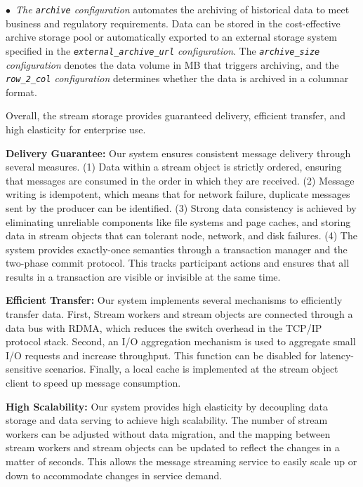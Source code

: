 $\bullet$~\textit{The \texttt{archive} configuration} automates the archiving of historical data to meet business and regulatory requirements. Data can be stored in the cost-effective \sys archive storage pool or automatically exported to an external storage system specified in the \textit{\texttt{external\_archive\_url} configuration}. The \textit{\texttt{archive\_size} configuration} denotes the data volume in MB that triggers archiving, and the \textit{\texttt{row\_2\_col} configuration} determines whether the data is archived in a columnar format. 

Overall, the \sys stream storage provides guaranteed delivery, efficient transfer, and high elasticity for enterprise use.

\noindent\textbf{Delivery Guarantee:} Our system ensures consistent message delivery through several measures. (1) Data within a stream object is strictly ordered, ensuring that messages are consumed in the order in which they are received. (2) Message writing is idempotent, which means that for network failure, duplicate messages sent by the producer  can be identified.
 (3) Strong data consistency is achieved by eliminating unreliable components like file systems and page caches, and storing data in  stream objects that can tolerant node, network, and disk failures. (4) The system provides exactly-once semantics through  a transaction manager and the two-phase commit protocol. This tracks participant actions and ensures that all results in a transaction are visible or invisible at the same time.
 

\noindent\textbf{Efficient Transfer:} Our system implements several mechanisms to efficiently transfer data. First, Stream workers and stream objects are connected through a data bus with RDMA, which reduces the switch overhead in the TCP/IP protocol stack. Second, an I/O aggregation mechanism is used to aggregate small I/O requests and increase throughput. This function can be disabled for latency-sensitive scenarios. Finally, a local cache is implemented at the stream object client to speed up message consumption.

\noindent\textbf{High Scalability:} Our system provides high elasticity by decoupling data storage and data serving to achieve high scalability. The number of stream workers can be adjusted without data migration, and the mapping between stream workers and stream objects can be updated to reflect the changes in a matter of seconds. This allows the message streaming service to easily scale up or down to accommodate changes in service demand.



